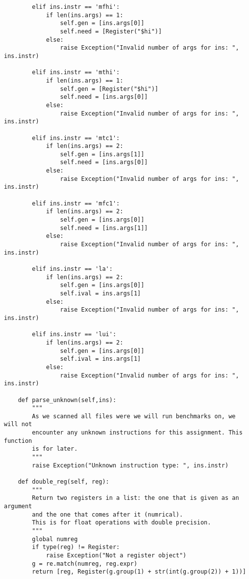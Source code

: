 \begin{lstlisting}
        elif ins.instr == 'mfhi':   
            if len(ins.args) == 1:
                self.gen = [ins.args[0]]
                self.need = [Register("$hi")]
            else:
                raise Exception("Invalid number of args for ins: ", ins.instr) 
                         
        elif ins.instr == 'mthi':     
            if len(ins.args) == 1:
                self.gen = [Register("$hi")]
                self.need = [ins.args[0]]
            else:
                raise Exception("Invalid number of args for ins: ", ins.instr)
                          
        elif ins.instr == 'mtc1':    
            if len(ins.args) == 2:
                self.gen = [ins.args[1]]
                self.need = [ins.args[0]]
            else:
                raise Exception("Invalid number of args for ins: ", ins.instr)  
                       
        elif ins.instr == 'mfc1':  
            if len(ins.args) == 2:
                self.gen = [ins.args[0]]
                self.need = [ins.args[1]]
            else:
                raise Exception("Invalid number of args for ins: ", ins.instr) 
                           
        elif ins.instr == 'la':   
            if len(ins.args) == 2:
                self.gen = [ins.args[0]]
                self.ival = ins.args[1]
            else:
                raise Exception("Invalid number of args for ins: ", ins.instr)
                            
        elif ins.instr == 'lui':        
            if len(ins.args) == 2:
                self.gen = [ins.args[0]]
                self.ival = ins.args[1]
            else:
                raise Exception("Invalid number of args for ins: ", ins.instr)        

    def parse_unknown(self,ins):
        """
        As we scanned all files were we will run benchmarks on, we will not
        encounter any unknown instructions for this assignment. This function
        is for later.
        """
        raise Exception("Unknown instruction type: ", ins.instr)
        
    def double_reg(self, reg):
        """
        Return two registers in a list: the one that is given as an argument
        and the one that comes after it (numrical).
        This is for float operations with double precision.
        """
        global numreg
        if type(reg) != Register:
            raise Exception("Not a register object")
        g = re.match(numreg, reg.expr)
        return [reg, Register(g.group(1) + str(int(g.group(2)) + 1))]
        

\end{lstlisting}
